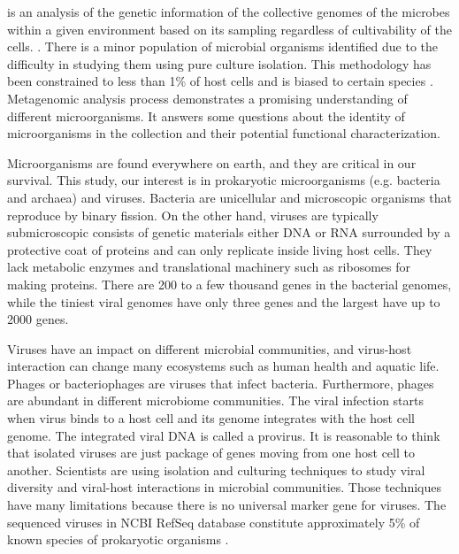 \documentclass[10pt,journal,compsoc]{IEEEtran}
\begin{document}
% 
% 
% 
% 
 is an analysis of the genetic information of the collective genomes of the microbes within a given environment based on its sampling regardless of cultivability of the cells. \cite{izard2014metagenomics}. There is a minor population of microbial organisms identified due to the difficulty in studying them using pure culture isolation. This methodology has been constrained to less than 1\% of host cells and is biased to certain species \cite{labonte2015single}.
Metagenomic analysis process demonstrates a promising understanding of different microorganisms. It answers some questions about the identity of microorganisms in the collection and their potential functional characterization.

Microorganisms are found everywhere on earth, and they are critical in our survival. This study, our interest is in prokaryotic microorganisms (e.g. bacteria and archaea) and viruses. Bacteria are unicellular and microscopic organisms that reproduce by binary fission. On the other hand, viruses are typically submicroscopic consists of genetic materials either DNA or RNA surrounded by a protective coat of proteins and can only replicate inside living host cells. They lack metabolic enzymes and translational machinery such as ribosomes for making proteins. There are 200 to a few thousand genes in the bacterial genomes, while the tiniest viral genomes have only three genes and the largest have up to 2000 genes.

Viruses have an impact on different microbial communities, and virus-host interaction can change many ecosystems such as human health and aquatic life. Phages or bacteriophages are viruses that infect bacteria. Furthermore, phages are abundant in different microbiome communities. The viral infection starts when virus binds to a host cell and its genome integrates with the host cell genome. The integrated viral DNA is called a provirus. It is reasonable to think that isolated viruses are just package of genes moving from one host cell to another. Scientists are using isolation and culturing techniques to study viral diversity and viral-host interactions in microbial communities. Those techniques have many limitations because there is no universal marker gene for viruses. The sequenced viruses in NCBI RefSeq database constitute approximately 5\% of known species of prokaryotic organisms \cite{roux2015viral}.
\end{document}
